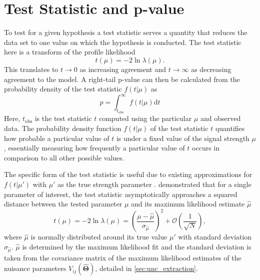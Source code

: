 \section{Test Statistic and p-value}

To test for a given hypothesis a test statistic serves a quantity that reduces the data set to one value on which the hypothesis is conducted. The test statistic here is a transform of the profile likelihood
\begin{equation}
    t(\mu)=-2\ln \lambda(\mu).
\end{equation}
This translates to $t \rightarrow 0$ as increasing agreement and $t \rightarrow \infty$ as decreasing agreement to the model. A right-tail p-value can then be calculated from the probability density of the test statistic $f(t | \mu)$ as
\begin{equation}\label{eq:p-value}
    p= \int_{t_\text{obs}}^{\infty}
    f(t | \mu) \mathrm{d}t
\end{equation}
Here, $t_\text{obs}$ is the test statistic $t$ computed using the particular $\mu$ and observed data. The probability density function $f(t | \mu)$ of the test statistic $t$ quantifies how probable a particular value of $t$ is under a fixed value of the signal strength $\mu$, essentially measuring how frequently a particular value of $t$ occurs in comparison to all other possible values.

The specific form of the test statistic is useful due to existing approximations for $f(t | \mu')$ with $\mu'$ as the true strength parameter \citep{cowan2011asymptotic}. \citet{wald1943tests} demonstrated that for a single parameter of interest, the test statistic asymptotically approaches  a squared distance between the tested parameter $\mu$ and its maximum likelihood estimate $\hat{\mu}$
\begin{equation}
    t(\mu)=-2\ln \lambda(\mu)=
    \left(\frac{\mu-\hat{\mu}}{\sigma_{\hat{\mu}}} \right)^2
    + \mathcal{O}(\frac{1}{\sqrt{N}}),
\end{equation}
where $\hat{\mu}$ is normally distributed around its true value $\mu'$ with standard deviation $\sigma_{\hat{\mu}}$. $\hat{\mu}$ is determined by the maximum likelihood fit and the standard deviation is taken from the covariance matrix of the maximum likelihood estimates of the nuisance parameters $V_{ij}(\hat{\bm{\Theta}})$, detailed in \ref{sec:unc_extraction}.

